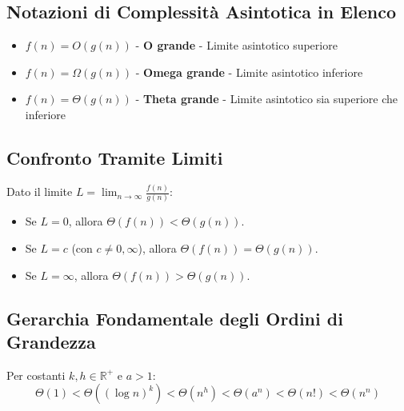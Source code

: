 \subsection{Notazioni di Complessità Asintotica in Elenco}

\begin{itemize}
    \item $f(n) = O(g(n))$ - \textbf{O grande} - Limite asintotico superiore
    \item $f(n) = \Omega(g(n))$ - \textbf{Omega grande} - Limite asintotico inferiore
    \item $f(n) = \Theta(g(n))$ - \textbf{Theta grande} - Limite asintotico sia superiore che inferiore
\end{itemize}

\subsection{Confronto Tramite Limiti}
Dato il limite $L = \lim_{n\to\infty} \frac{f(n)}{g(n)}$:
\begin{itemize}
    \item Se $L = 0$, allora $\Theta(f(n)) < \Theta(g(n))$.
    \item Se $L = c$ (con $c \neq 0, \infty$), allora $\Theta(f(n)) = \Theta(g(n))$.
    \item Se $L = \infty$, allora $\Theta(f(n)) > \Theta(g(n))$.
\end{itemize}

\subsection{Gerarchia Fondamentale degli Ordini di Grandezza}
Per costanti $k,h \in \mathbb{R}^+$ e $a>1$:
$$ \Theta(1) < \Theta((\log n)^{k}) < \Theta(n^{h}) < \Theta(a^{n}) < \Theta(n!) < \Theta(n^{n}) $$

